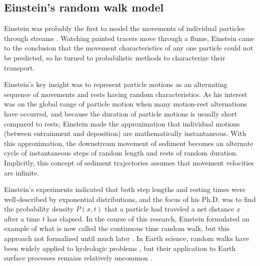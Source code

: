 \subsection{Einstein's random walk model}
\label{sec:einwalk}
Einstein was probably the first to model the movements of individual particles through streams \citep{Einstein1937}.
Watching painted tracers move through a flume, Einstein came to the conclusion that the movement characteristics of any one particle could not be predicted, so he turned to probabilistic methods to characterize their transport.

Einstein's key insight was to represent particle motions as an alternating sequence of movements and rests having random characteristics.
As his interest was on the global range of particle motion when many motion-rest alternations have occurred, and because the duration of particle motions is usually short compared to rests, Einstein made the approximation that individual motions (between entrainment and deposition) are mathematically instantaneous.
With this approximation, the downstream movement of sediment becomes an alternate cycle of instantaneous steps of random length and rests of random duration. 
Implicitly, this concept of sediment trajectories assumes that movement velocities are infinite.

Einstein's experiments indicated that both step lengths and resting times were well-described by exponential distributions, and the focus of his Ph.D. was to find the probability density $P(x,t)$ that a particle had traveled a net distance $x$ after a time $t$ has elapsed. In the course of this research, Einstein formulated an example of what is now called the continuous time random walk, but this approach not formalized until much later \citep{Montroll1965}. In Earth science, random walks have been widely applied to hydrologic problems \citep{Berkowitz2006}, but their application to Earth surface processes remains relatively uncommon \citep[e.g.][]{Schumer2009}.

